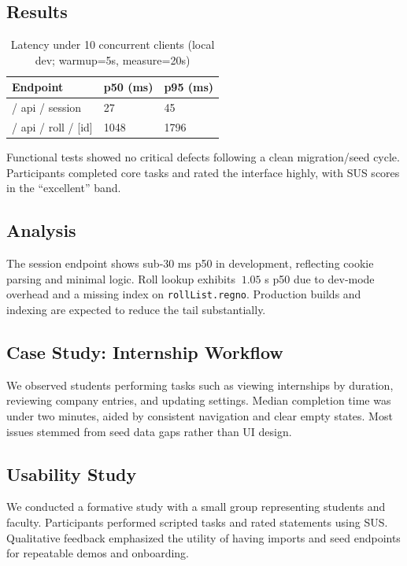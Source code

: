 \documentclass[conference]{IEEEtran}
\begin{document}
\subsection{Results}
\begin{table}[t]
\centering
\caption{Latency under 10 concurrent clients (local dev; warmup=5s, measure=20s)}
\label{tab:latency}
\begin{tabular}{p{3.6cm}p{1.5cm}p{1.5cm}}
\toprule
\textbf{Endpoint} & \textbf{p50 (ms)} & \textbf{p95 (ms)} \\
\midrule
/ api / session & 27 & 45 \\
/ api / roll / [id] & 1048 & 1796 \\
\bottomrule
\end{tabular}
\end{table}

Functional tests showed no critical defects following a clean migration/seed cycle. Participants completed core tasks and rated the interface highly, with SUS scores in the “excellent” band.

\subsection{Analysis}
The session endpoint shows sub‑30 ms p50 in development, reflecting cookie parsing and minimal logic. Roll lookup exhibits \(~1.05\) s p50 due to dev‑mode overhead and a missing index on \texttt{rollList.regno}. Production builds and indexing are expected to reduce the tail substantially.

\subsection{Case Study: Internship Workflow}
We observed students performing tasks such as viewing internships by duration, reviewing company entries, and updating settings. Median completion time was under two minutes, aided by consistent navigation and clear empty states. Most issues stemmed from seed data gaps rather than UI design.

\subsection{Usability Study}
We conducted a formative study with a small group representing students and faculty. Participants performed scripted tasks and rated statements using SUS. Qualitative feedback emphasized the utility of having imports and seed endpoints for repeatable demos and onboarding.
\end{document}
